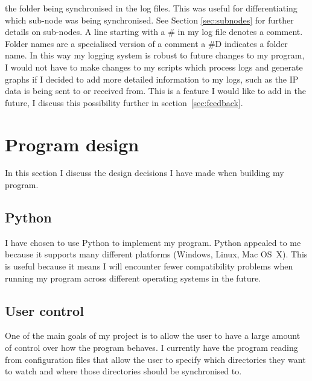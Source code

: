 \documentclass[12pt]{article}
\begin{document}
the folder being synchronised in the log files.
This was useful for differentiating which sub-node
was being synchronised. See Section \ref{sec:subnodes} for
further details on sub-nodes. A line starting with
a \# in my log file denotes a comment. Folder names
are a specialised version of a comment a \#D indicates
a folder name. In this way my logging system is robust
to future changes to my program, I would not have to
make changes to my scripts which process logs and generate graphs
if I decided to add more detailed information to my logs,
such as the IP data is being sent to or received from. This
is a feature I would like to add in the future, I discuss this
possibility further in section~\ref{sec:feedback}.

\newpage
\section{Program design}
In this section I discuss the design decisions I have
made when building my program.

\subsection{Python}
I have chosen to use Python to implement
my program. Python appealed to me because it
supports many different platforms (Windows, Linux, Mac OS~X).
This is useful because it means I will
encounter fewer compatibility problems when running
my program across different operating systems in the future.


\subsection{User control}
One of the main goals of my project is to allow the user
to have a  large amount of control over how the program
behaves. I currently have the program reading from
configuration files that allow the user to specify
which directories they want to watch and where those
directories should be synchronised to.
\end{document}
